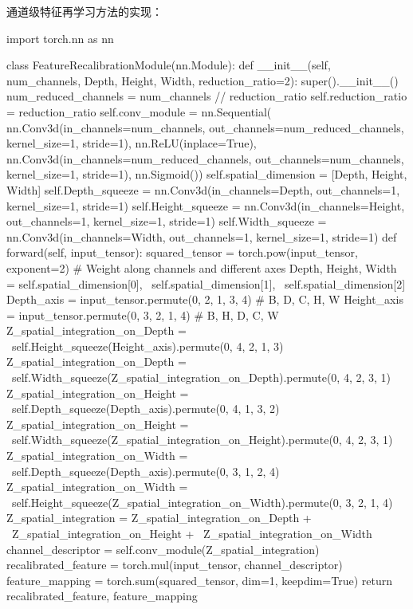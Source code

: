 通道级特征再学习方法的实现：
\begin{codeblock}[language=Python]

import torch.nn as nn

class FeatureRecalibrationModule(nn.Module):
    def __init__(self, num_channels, Depth, Height, Width, reduction_ratio=2):
        super().__init__()
        num_reduced_channels = num_channels // reduction_ratio
        self.reduction_ratio = reduction_ratio
        self.conv_module = nn.Sequential(
            nn.Conv3d(in_channels=num_channels, 
                      out_channels=num_reduced_channels, 
                      kernel_size=1, 
                      stride=1),
            nn.ReLU(inplace=True),
            nn.Conv3d(in_channels=num_reduced_channels, 
                      out_channels=num_channels, 
                      kernel_size=1, 
                      stride=1),
            nn.Sigmoid())
        self.spatial_dimension = [Depth, Height, Width]
        self.Depth_squeeze  = nn.Conv3d(in_channels=Depth,  
                                        out_channels=1, 
                                        kernel_size=1, 
                                        stride=1)
        self.Height_squeeze = nn.Conv3d(in_channels=Height, 
                                        out_channels=1, 
                                        kernel_size=1, 
                                        stride=1)
        self.Width_squeeze  = nn.Conv3d(in_channels=Width,  
                                        out_channels=1, 
                                        kernel_size=1, 
                                        stride=1)
    def forward(self, input_tensor):
        squared_tensor = torch.pow(input_tensor, exponent=2)
        # Weight along channels and different axes
        Depth, Height, Width = self.spatial_dimension[0], \
                               self.spatial_dimension[1], \
                               self.spatial_dimension[2]
        Depth_axis = input_tensor.permute(0, 2, 1, 3, 4)        # B, D, C, H, W
        Height_axis = input_tensor.permute(0, 3, 2, 1, 4)       # B, H, D, C, W
        Z_spatial_integration_on_Depth = \
            self.Height_squeeze(Height_axis).permute(0, 4, 2, 1, 3)
        Z_spatial_integration_on_Depth = \
            self.Width_squeeze(Z_spatial_integration_on_Depth).permute(0, 4, 2, 3, 1)
        Z_spatial_integration_on_Height = \
            self.Depth_squeeze(Depth_axis).permute(0, 4, 1, 3, 2)
        Z_spatial_integration_on_Height = \
            self.Width_squeeze(Z_spatial_integration_on_Height).permute(0, 4, 2, 3, 1)
        Z_spatial_integration_on_Width = \
            self.Depth_squeeze(Depth_axis).permute(0, 3, 1, 2, 4)
        Z_spatial_integration_on_Width = \
            self.Height_squeeze(Z_spatial_integration_on_Width).permute(0, 3, 2, 1, 4)
        Z_spatial_integration = Z_spatial_integration_on_Depth + \
                                Z_spatial_integration_on_Height + \
                                Z_spatial_integration_on_Width
        channel_descriptor = self.conv_module(Z_spatial_integration)
        recalibrated_feature = torch.mul(input_tensor, channel_descriptor)
        feature_mapping = torch.sum(squared_tensor, dim=1, keepdim=True)
        return recalibrated_feature, feature_mapping

\end{codeblock}